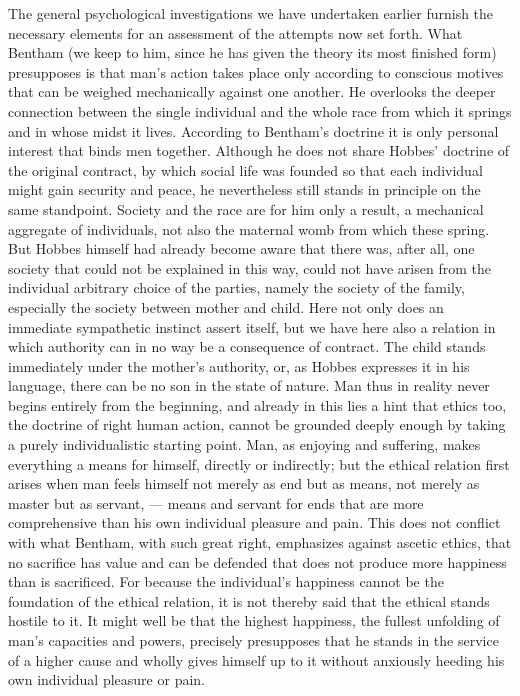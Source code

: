 \documentclass[12pt,a4paper,openany]{book}
\newcommand{\opage}[1]{\marginnote{\footnotesize\textit{[#1]}}}
\begin{document}
The general psychological investigations we have undertaken earlier furnish
the necessary elements for an assessment of the attempts now set forth. What
Bentham (we keep to him, since he has given the theory its most finished form)
presupposes is that man's action takes place only according to conscious
motives that can be weighed mechanically against one another. He overlooks the
deeper connection between the single individual and the whole race from which
it springs and in whose midst it lives. According to Bentham's doctrine it is
only personal interest that binds men together. Although he does not share
Hobbes' doctrine of the original contract, by which social life was founded so
that each individual might gain security and peace, he nevertheless still
stands in principle on the same standpoint. Society and the race are for him
only a result, a mechanical aggregate of individuals, not also the maternal
womb from which these spring. But Hobbes himself had already become aware that
there was, after all, one society that could not be explained in this way,
could not have arisen from the individual arbitrary choice of the parties,
namely the society of the family, especially the society between mother and
child. Here not only does an immediate sympathetic instinct assert itself, but
we have here also a relation in which authority can in no way be a consequence
of contract. The child stands immediately under the mother's authority, or, as
Hobbes \opage{28}expresses it in his language, there can be no son in the
state of nature. Man thus in reality never begins entirely from the beginning,
and already in this lies a hint that ethics too, the doctrine of right human
action, cannot be grounded deeply enough by taking a purely individualistic
starting point. Man, as enjoying and suffering, makes everything a means for
himself, directly or indirectly; but the ethical relation first arises when
man feels himself not merely as end but as means, not merely as master but as
servant, --- means and servant for ends that are more comprehensive than his
own individual pleasure and pain. This does not conflict with what Bentham,
with such great right, emphasizes against ascetic ethics, that no sacrifice
has value and can be defended that does not produce more happiness than is %
sacrificed. For because the individual's happiness cannot be the foundation of
the ethical relation, it is not thereby said that the ethical stands hostile
to it. It might well be that the highest happiness, the fullest unfolding of
man's capacities and powers, precisely presupposes that he stands in the
service of a higher cause and wholly gives himself up to it without anxiously
heeding his own individual pleasure or pain.
\end{document}

